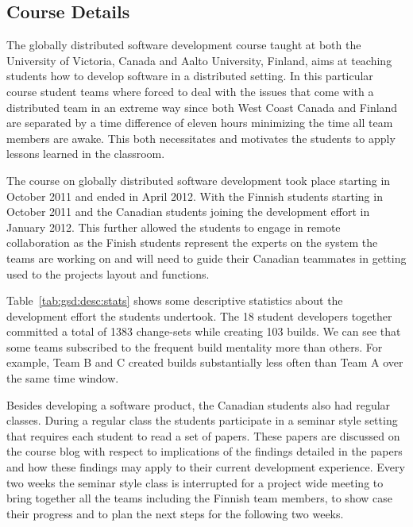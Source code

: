 
\subsection{Course Details}
The globally distributed software development course taught at both the University of Victoria, Canada and Aalto University, Finland, aims at teaching students how to develop software in a distributed setting.
In this particular course student teams where forced to deal with the issues that come with a distributed team in an extreme way since both West Coast Canada and Finland are separated by a time difference of eleven hours minimizing the time all team members are awake.
This both necessitates and motivates the students to apply lessons learned in the classroom.

The course on globally distributed software development took place starting in October 2011 and ended in April 2012.
With the Finnish students starting in October 2011 and the Canadian students joining the development effort in January 2012.
This further allowed the students to engage in remote collaboration as the Finish students represent the experts on the system the teams are working on and will need to guide their Canadian teammates in getting used to the projects layout and functions.

Table~\ref{tab:gsd:desc:stats} shows some descriptive statistics about the development effort the students undertook.
The 18 student developers together committed a total of 1383 change-sets while creating 103 builds.
We can see that some teams subscribed to the frequent build mentality more than others. For example, Team B and C created builds substantially less often than Team A over the same time window.

Besides developing a software product, the Canadian students also had regular classes.
During a regular class the students participate in a seminar style setting that requires each student to read a set of papers.
These papers are discussed on the course blog with respect to implications of the findings detailed in the papers and how these findings may apply to their current development experience.
Every two weeks the seminar style class is interrupted for a project wide meeting to bring together all the teams including the Finnish team members, to show case their progress and to plan the next steps for the following two weeks.

